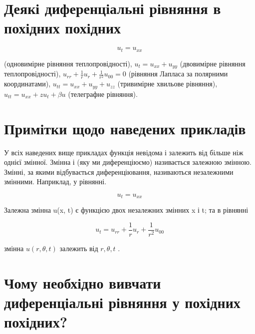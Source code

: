 \documentclass[
  ukrainian,
]{article}
\begin{document}
\section{Деякі диференціальні рівняння в похідних
похідних}\label{ux434ux435ux44fux43aux456-ux434ux438ux444ux435ux440ux435ux43dux446ux456ux430ux43bux44cux43dux456-ux440ux456ux432ux43dux44fux43dux43dux44f-ux432-ux43fux43eux445ux456ux434ux43dux438ux445-ux43fux43eux445ux456ux434ux43dux438ux445}

\[u_t = u_{xx}\]

(одновимірне рівняння теплопровідності), \(u_t = u_{xx} + u_{yy}\)
(двовимірне рівняння теплопровідності),
\(u_{rr} + \frac{1}{r}u_r + \frac{1}{r^2}u_{00} = 0\) (рівняння Лапласа
за полярними координатами), \(u_{tt} = u_{xx} + u_{yy} + u_{zz}\)
(тривимірне хвильове рівняння), \(u_{tt} = u_{xx} + zu_t + \beta u\)
(телеграфне рівняння).

\section{Примітки щодо наведених
прикладів}\label{ux43fux440ux438ux43cux456ux442ux43aux438-ux449ux43eux434ux43e-ux43dux430ux432ux435ux434ux435ux43dux438ux445-ux43fux440ux438ux43aux43bux430ux434ux456ux432}

У всіх наведених вище прикладах функція невідома і залежить від більше
ніж однієї змінної. Змінна і (яку ми диференціюємо) називається залежною
змінною. Змінні, за якими відбувається диференціювання, називаються
незалежними змінними. Наприклад, у рівнянні.

\[u_t = u_{xx}\]

Залежна змінна u(x, t) є функцією двох незалежних змінних x і t; та в
рівнянні

\[u_t = u_{rr} + \frac{1}{r} u_r + \frac{1}{r^2} u_{00}\]

змінна \(u(r, \theta, t)\) залежить від \(r, \theta, t\) .

\section{Чому необхідно вивчати диференціальні рівняння у похідних
похідних?}\label{ux447ux43eux43cux443-ux43dux435ux43eux431ux445ux456ux434ux43dux43e-ux432ux438ux432ux447ux430ux442ux438-ux434ux438ux444ux435ux440ux435ux43dux446ux456ux430ux43bux44cux43dux456-ux440ux456ux432ux43dux44fux43dux43dux44f-ux443-ux43fux43eux445ux456ux434ux43dux438ux445-ux43fux43eux445ux456ux434ux43dux438ux445}
\end{document}
